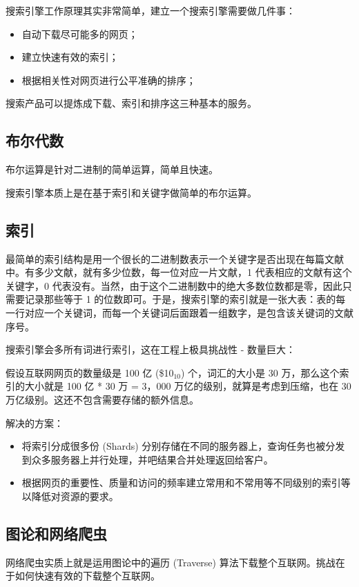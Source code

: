 \documentclass[11pt]{article}
\begin{document}
搜索引擎工作原理其实非常简单，建立一个搜索引擎需要做几件事：
\begin{itemize}
\item 自动下载尽可能多的网页；
\item 建立快速有效的索引；
\item 根据相关性对网页进行公平准确的排序；
\end{itemize}

搜索产品可以提炼成下载、索引和排序这三种基本的服务。

\subsection{布尔代数}
\label{sec:org31c3448}
布尔运算是针对二进制的简单运算，简单且快速。

搜索引擎本质上是在基于索引和关键字做简单的布尔运算。

\subsection{索引}
\label{sec:orga9901e9}
最简单的索引结构是用一个很长的二进制数表示一个关键字是否出现在每篇文献中。有多少文献，就有多少位数，每一位对应一片文献，1 代表相应的文献有这个关键字，0 代表没有。当然，由于这个二进制数中的绝大多数位数都是零，因此只需要记录那些等于 1 的位数即可。于是，搜索引擎的索引就是一张大表：表的每一行对应一个关键词，而每一个关键词后面跟着一组数字，是包含该关键词的文献序号。

搜索引擎会多所有词进行索引，这在工程上极具挑战性 - 数量巨大：

假设互联网网页的数量级是 100 亿 (\$10\(_{\text{10}}\)) 个，词汇的大小是 30 万，那么这个索引的大小就是 100 亿 * 30 万 = 3，000 万亿的级别，就算是考虑到压缩，也在 30 万亿级别。这还不包含需要存储的额外信息。

解决的方案：
\begin{itemize}
\item 将索引分成很多份 (Shards) 分别存储在不同的服务器上，查询任务也被分发到众多服务器上并行处理，并吧结果合并处理返回给客户。
\item 根据网页的重要性、质量和访问的频率建立常用和不常用等不同级别的索引等以降低对资源的要求。
\end{itemize}

\subsection{图论和网络爬虫}
\label{sec:orge8b736f}
网络爬虫实质上就是运用图论中的遍历 (Traverse) 算法下载整个互联网。挑战在于如何快速有效的下载整个互联网。
\end{document}
